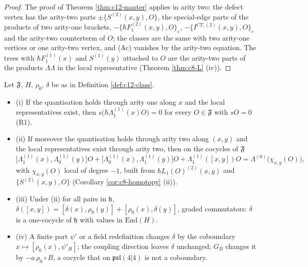 \begin{proof}
The proof of Theorem \ref{thm:c12-master} applies in arity two: the defect vertex has the arity-two parts $\pm\{S^{(2)}(x,y),O\}$, the special-edge parts of the products of two arity-one brackets, $-\{\hbar F_1^{(2)}(x,y),O\}_\varepsilon$, $-\{I^{CT,(2)}(x,y),O\}_\varepsilon$ and the arity-two counterterm of $O$; the classes are the same with two arity-one vertices or one arity-two vertex, and (Ac) vanishes by the arity-two equation. The trees with $\hbar F_1^{(1)}(x)$ and $S^{(1)}(y)$ attached to $O$ are the arity-two parts of the products $\Lambda\Lambda$ in the local representative (Theorem \ref{thm:c8-L} (iv)).
\end{proof}

\begin{theorem}
\label{thm:c12-opalg}
Let $\mathfrak F$, $H$, $\rho_0$, $\delta$ be as in Definition \ref{def:c12-class}.
\begin{itemize}
\item (i) If the quantisation holds through arity one along $x$ and the local representatives exist, then $s\big(\hbar\Lambda^{(1)}_1(x)O\big)=0$ for every $O\in\mathfrak F$ with $sO=0$ (R1).
\item (ii) If moreover the quantisation holds through arity two along $(x,y)$ and the local representatives exist through arity two, then on the cocycles of $\mathfrak F$
\begin{equation}
\big[\Lambda^{(1)}_1(x),\Lambda^{(1)}_0(y)\big]O+\big[\Lambda^{(1)}_0(x),\Lambda^{(1)}_1(y)\big]O+\Lambda^{(1)}_1([x,y])O=\Lambda^{(0)}\big(\chi_{x,y}(O)\big),
\label{eq:c12-Rxy}
\end{equation}
with $\chi_{x,y}(O)$ local of degree $-1$, built from $\hbar L_1(O)^{(2)}(x,y)$ and $\{S^{(2)}(x,y),O\}$ (Corollary \ref{cor:c8-homotopy} (ii)).
\item (iii) Under (ii) for all pairs in $\mathfrak h$, $\delta([x,y])=[\delta(x),\rho_0(y)]+[\rho_0(x),\delta(y)]$, graded commutators: $\delta$ is a one-cocycle of $\mathfrak h$ with values in $\mathrm{End}(H)$.
\item (iv) A finite part $\psi'$ or a field redefinition changes $\delta$ by the coboundary $x\mapsto[\rho_0(x),\psi'_H]$; the coupling direction leaves $\delta$ unchanged; $G_B$ changes it by $-a\,\rho_0\circ B$, a cocycle that on $\mathfrak{psl}(4|4)$ is not a coboundary.
\end{itemize}
\end{theorem}

